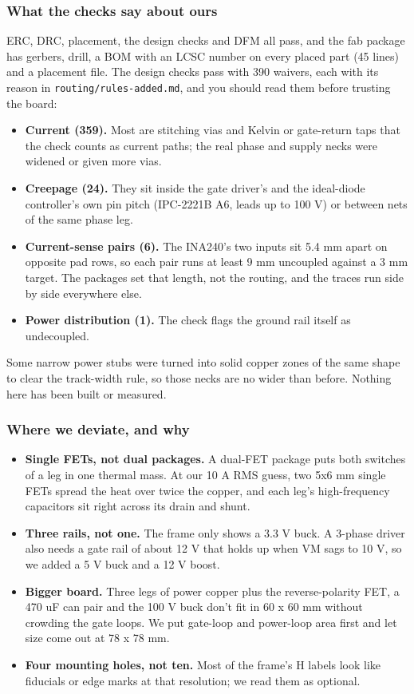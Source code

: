 \documentclass[11pt,a4paper]{article}
\begin{document}
\subsubsection*{What the checks say about ours}
ERC, DRC, placement, the design checks and DFM all pass, and the fab package has gerbers, drill, a BOM with an LCSC number on every placed part (45 lines) and a placement file. The design checks pass with 390 waivers, each with its reason in \texttt{routing/rules-added.md}, and you should read them before trusting the board:

\begin{itemize}
\item \textbf{Current (359).} Most are stitching vias and Kelvin or gate-return taps that the check counts as
current paths; the real phase and supply necks were widened or given more vias.
\item \textbf{Creepage (24).} They sit inside the gate driver's and the ideal-diode controller's own pin pitch
(IPC-2221B A6, leads up to 100 V) or between nets of the same phase leg.
\item \textbf{Current-sense pairs (6).} The INA240's two inputs sit 5.4 mm apart on opposite pad rows, so
each pair runs at least 9 mm uncoupled against a 3 mm target. The packages set that length, not
the routing, and the traces run side by side everywhere else.
\item \textbf{Power distribution (1).} The check flags the ground rail itself as undecoupled.
\end{itemize}
Some narrow power stubs were turned into solid copper zones of the same shape to clear the track-width rule, so those necks are no wider than before. Nothing here has been built or measured.

\subsubsection*{Where we deviate, and why}
\begin{itemize}
\item \textbf{Single FETs, not dual packages.} A dual-FET package puts both switches of a leg in one thermal
mass. At our 10 A RMS guess, two 5x6 mm single FETs spread the heat over twice the copper, and
each leg's high-frequency capacitors sit right across its drain and shunt.
\item \textbf{Three rails, not one.} The frame only shows a 3.3 V buck. A 3-phase driver also needs a gate
rail of about 12 V that holds up when VM sags to 10 V, so we added a 5 V buck and a 12 V boost.
\item \textbf{Bigger board.} Three legs of power copper plus the reverse-polarity FET, a 470 uF can pair and the 100 V buck don't fit in
60 x 60 mm without crowding the gate loops. We put gate-loop and power-loop area first and let size
come out at 78 x 78 mm.
\item \textbf{Four mounting holes, not ten.} Most of the frame's H labels look like fiducials or edge marks
at that resolution; we read them as optional.
\end{itemize}
\end{document}
